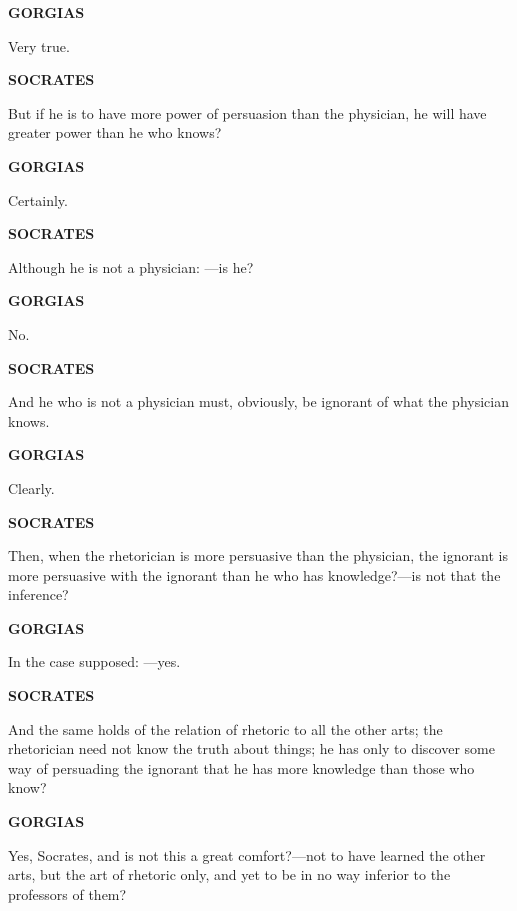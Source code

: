 \documentclass[11pt,letter]{article}
\begin{document}
\par \textbf{GORGIAS}
\par   Very true.

\par \textbf{SOCRATES}
\par   But if he is to have more power of persuasion than the physician, he will have greater power than he who knows?

\par \textbf{GORGIAS}
\par   Certainly.

\par \textbf{SOCRATES}
\par   Although he is not a physician: —is he?

\par \textbf{GORGIAS}
\par   No.

\par \textbf{SOCRATES}
\par   And he who is not a physician must, obviously, be ignorant of what the physician knows.

\par \textbf{GORGIAS}
\par   Clearly.

\par \textbf{SOCRATES}
\par   Then, when the rhetorician is more persuasive than the physician, the ignorant is more persuasive with the ignorant than he who has knowledge?—is not that the inference?

\par \textbf{GORGIAS}
\par   In the case supposed: —yes.

\par \textbf{SOCRATES}
\par   And the same holds of the relation of rhetoric to all the other arts; the rhetorician need not know the truth about things; he has only to discover some way of persuading the ignorant that he has more knowledge than those who know?

\par \textbf{GORGIAS}
\par   Yes, Socrates, and is not this a great comfort?—not to have learned the other arts, but the art of rhetoric only, and yet to be in no way inferior to the professors of them?
\end{document}
